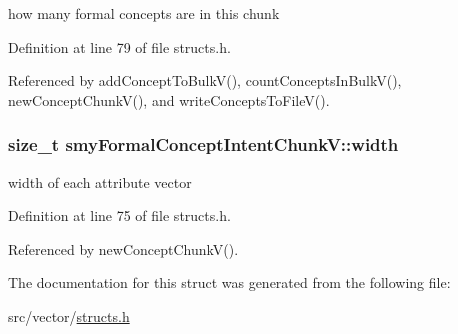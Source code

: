 how many formal concepts are in this chunk 



\-Definition at line 79 of file structs.\-h.



\-Referenced by add\-Concept\-To\-Bulk\-V(), count\-Concepts\-In\-Bulk\-V(), new\-Concept\-Chunk\-V(), and write\-Concepts\-To\-File\-V().

\hypertarget{structsmyFormalConceptIntentChunkV_a34213d18382955bee724884cd2bfd82c}{
\subsubsection[{width}]{\setlength{\rightskip}{0pt plus 5cm}size\-\_\-t {\bf smy\-Formal\-Concept\-Intent\-Chunk\-V\-::width}}}\label{structsmyFormalConceptIntentChunkV_a34213d18382955bee724884cd2bfd82c}


width of each attribute vector 



\-Definition at line 75 of file structs.\-h.



\-Referenced by new\-Concept\-Chunk\-V().



\-The documentation for this struct was generated from the following file\-:\begin{DoxyCompactItemize}
\item 
src/vector/\hyperlink{vector_2structs_8h}{structs.\-h}\end{DoxyCompactItemize}
